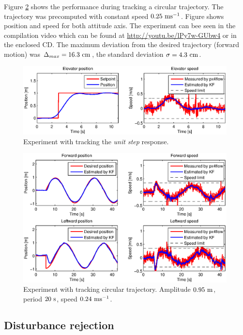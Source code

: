 Figure \ref{fig:experiment_sine_1} shows the performance during tracking a circular trajectory. The trajectory was precomputed with constant speed $0.25~\mathrm{ms^{-1}}$. Figure shows position and speed for both attitude axis. The experiment can bee seen in the compilation video which can be found at \url{http://youtu.be/lPy7w-GUbw4} or in the enclosed CD. The maximum deviation from the desired trajectory (forward motion) was $\Delta_{max} = 16.3~\mathrm{cm}$, the standard deviation $\sigma = 4.3~\mathrm{cm}$.

\begin{figure}[h]
\centering
\includegraphics[width=0.99\textwidth]{fig/experiment2_step.eps}
\caption{Experiment with tracking the \emph{unit step} response.}
\label{fig:experiment_step}
\end{figure}

\begin{figure}[H]
\centering
\includegraphics[width=0.99\textwidth]{fig/experiment1_sine.eps}
\caption{Experiment with tracking circular trajectory. Amplitude $0.95~\mathrm{m}$, period $20~\mathrm{s}$, speed $0.24~\mathrm{ms^{-1}}$.}
\label{fig:experiment_sine_1}
\end{figure}

\subsection{Disturbance rejection}

